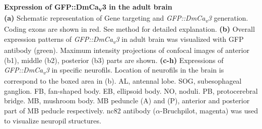 \label{fig:2} 
\textbf{Expression of GFP::DmCa\textsubscript{v}3 in the adult brain} 
\\ 
\textbf{(a)} Schematic representation of Gene targeting and \emph{GFP::DmCa\textsubscript{v}3} generation. 
Coding exons are shown in red. 
See method for detailed explanation.
\textbf{(b)} Overall expression patterns of \emph{GFP::DmCa\textsubscript{v}3} in adult brain was visualized with GFP antibody (green). 
Maximum intensity projections of confocal images of anterior (b1), middle (b2), posterior (b3) parts are shown.
\textbf{(c-h)} Expressions of \emph{GFP::DmCa\textsubscript{v}3} in specific neurofils. Location of neurofils in the brain is correspond to the boxed area in (b).
AL, antennal lobe. 
SOG, subesophageal ganglion. 
FB, fan-shaped body. 
EB, ellipsoid body.
NO, noduli. 
PB, protocerebral bridge. 
MB, mushroom body.  
MB peduncle (A) and (P), anterior and posterior part of MB peducle respectively.
nc82  antibody ($\alpha$-Bruchpilot, magenta) was used to visualize neuropil structures. 
  
  
  